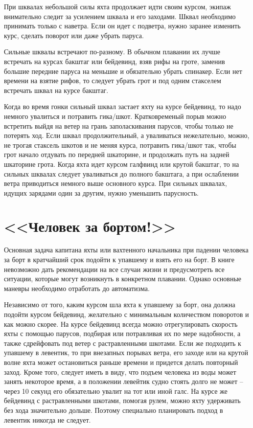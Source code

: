 При шквалах небольшой силы яхта продолжает идти своим курсом, экипаж внимательно следит за усилением шквала и его заходами. Шквал необходимо принимать только с наветра. Если он идет с подветра, нужно заранее изменить курс, сделать поворот или даже убрать паруса.

Сильные шквалы встречают по-разному. В обычном плавании их лучше встречать на курсах бакштаг или бейдевинд, взяв рифы на гроте, заменив большие передние паруса на меньшие и обязательно убрать спинакер. Если нет времени на взятие рифов, то следует убрать грот и под одним стакселем встречать шквал на курсе бакштаг.

Когда во время гонки сильный шквал застает яхту на курсе бейдевинд, то надо немного увалиться и потравить гика\-/шкот. Кратковременый порыв можно встретить выйдя на ветер на грань заполаскивания парусов, чтобы только не потерять ход. Если шквал продолжительный, а уваливаться нежелательно, можно, не трогая стаксель шкотов и не меняя курса, потравить гика\-/шкот так, чтобы грот начало отдувать по передней шкаторине, и продолжать путь на задней шкаторине грота. Когда яхта идет курсом галфвинд или крутой бакштаг, то на сильных шквалах следует уваливаться до полного бакштага, а при ослаблении ветра приводиться немного выше основного курса. При сильных шквалах, идущих зарядами один за другим, нужно уменьшить парусность.

\section{<<Человек за бортом!>>}

Основная задача капитана яхты или вахтенного начальника при падении человека за борт в кратчайший срок подойти к упавшему и взять его на борт. В книге невозможно дать рекомендации на все случаи жизни и предусмотреть все ситуации, которые могут возникнуть в конкретном плавании. Однако основные маневры необходимо отработать до автоматизма.

Независимо от того, каким курсом шла яхта к упавшему за борт, она должна подойти курсом бейдевинд, желательно с минимальным количеством поворотов и как можно скорее. На курсе бейдевинд всегда можно отрегулировать скорость яхты с помощью парусов, подбирая или потравливая их по мере надобности, а также сдрейфовать под ветер с растравленными шкотами. Если же подходить к упавшему в левентик, то при внезапных порывах ветра, его заходе или на крутой волне яхта может остановиться раньше времени и придется делать повторный заход. Кроме того, следует иметь в виду, что подъем человека из воды может занять некоторое время, а в положении левейтик судно стоять долго не может \--- через 10 секунд его обязательно увалит на тот или иной галс. На курсе же бейдевинд с растравленными шкотами, помогая рулем, можно яхту удерживать без хода значительно дольше. Поэтому специально планировать подход в левентик никогда не следует.


